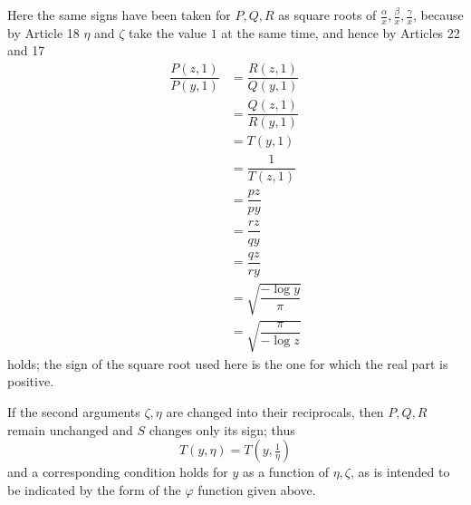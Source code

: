 Here the same signs have been taken for $P,\allowbreak Q,\allowbreak R$ as square roots of $\frac{\alpha}{x},\allowbreak \frac{\beta}{x},\allowbreak \frac{\gamma}{x}$, because by Article 18 $\eta$ and $\zeta$ take the value $1$ at the same time, and hence by Articles 22 and 17
\[
\begin{aligned}\dfrac{P(z,1)}{P(y,1)}&=\dfrac{R(z,1)}{Q(y,1)}\\[7pt]&=\dfrac{Q(z,1)}{R(y,1)}\\[7pt]&=T(y,1)\\[7pt]&=\dfrac{1}{T(z,1)}\\[7pt]&=\dfrac{pz}{py}\\[7pt]&=\dfrac{rz}{qy}\\[7pt]&=\dfrac{qz}{ry}\\[7pt]&=\surd {\dfrac{-\log y}{\pi}}\\[7pt]&=\surd {\dfrac{\pi}{-\log z}}\end{aligned}
\]
holds; the sign of the square root used here is the one for which the real part is positive.

If the second arguments $\zeta,\allowbreak \eta$ are changed into their reciprocals, then $P,\allowbreak Q,\allowbreak R$ remain unchanged and $S$ changes only its sign; thus
\[
T(y,\eta)=T(y,\tfrac{1}{\eta})
\]
and a corresponding condition holds for $y$ as a function of $\eta,\allowbreak \zeta$, as is intended to be indicated by the form of the $\varphi$ function given above.

